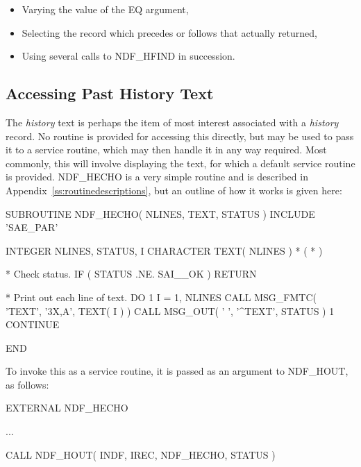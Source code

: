 \documentclass[twoside,11pt,nolof]{starlink}
\providecommand{\st}[1]{{\emph{#1}}}
\begin{document}
\begin{itemize}

\item Varying the value of the EQ argument,

\item Selecting the record which precedes or follows that actually returned,

\item Using several calls to NDF\_HFIND in succession.

\end{itemize}

\subsection{Accessing Past History Text}

The \st{history\/} text is perhaps the item of most interest associated
with a \st{history\/} record. No routine is provided for accessing this
directly, but  may be used to pass it to a service routine,
which may then handle it in any way required. Most commonly, this will
involve displaying the text, for which a default service routine
 is provided. NDF\_HECHO is a very simple routine and is
described in Appendix~\ref{ss:routinedescriptions}, but an outline of
how it works is given here:

\small
\begin{terminalv}
      SUBROUTINE NDF_HECHO( NLINES, TEXT, STATUS )
      INCLUDE 'SAE_PAR'

      INTEGER NLINES, STATUS, I
      CHARACTER TEXT( NLINES ) * ( * )

*  Check status.
      IF ( STATUS .NE. SAI__OK ) RETURN

*  Print out each line of text.
      DO 1 I = 1, NLINES
         CALL MSG_FMTC( 'TEXT', '3X,A', TEXT( I ) )
         CALL MSG_OUT( ' ', '^TEXT', STATUS )
 1    CONTINUE

      END
\end{terminalv}
\normalsize

To invoke this as a service routine, it is passed as an argument to
NDF\_HOUT, as follows:

\small
\begin{terminalv}
      EXTERNAL NDF_HECHO

      ...

      CALL NDF_HOUT( INDF, IREC, NDF_HECHO, STATUS )
\end{terminalv}
\normalsize
\end{document}

